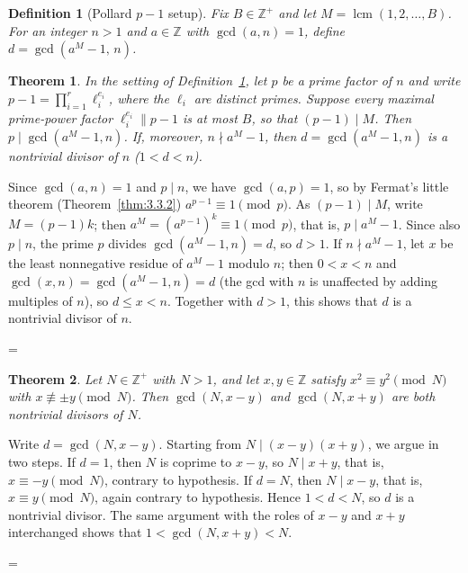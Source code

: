 \documentclass[11pt]{article}
\makeatletter
\theoremstyle{ntstyle}
\newtheorem{theorem}{Theorem}[subsection]
\newtheorem{definition}{Definition}[subsection]
\let\nt@closedisplay\]
\def\nt@guardedclose{\@ifnextchar\par{\nt@closeafterpar}{\@ifnextchar\end{\postdisplaypenalty\@M\nt@closedisplay}{\nt@closedisplay}}}
\def\nt@closeafterpar\par{\@ifnextchar\par{\nt@closeafterpar}{\@ifnextchar\end{\postdisplaypenalty\@M\nt@closedisplay\par}{\nt@closedisplay\par}}}
\renewenvironment{proof}[1][\proofname]{\par
  \pushQED{\qed}\normalfont\topsep\medskipamount\edef\nt@afterproof{\@endparpenalty=\the\@endparpenalty\relax}\@beginparpenalty\@M\@endparpenalty\@M\let\]\nt@guardedclose\trivlist\item[]\textit{#1\@addpunct{.}} \ignorespaces}{\ifvmode\addpenalty\@M\fi\popQED\nt@afterproof\endtrivlist\@endpefalse}
\DeclareMathOperator{\lcm}{lcm}
\makeatother
\begin{document}
\begin{definition}[Pollard $p-1$ setup]\label{def:9.5.1} Fix $B\in\mathbb{Z}^+$ and let
	$M=\lcm(1, 2, \ldots, B)$. For an integer $n>1$ and $a\in\mathbb{Z}$
	with $\gcd(a, n)=1$, define $d = \gcd(a^M-1, \, n)$.

\end{definition}
\begin{theorem}\label{thm:9.5.2} In the setting of
	Definition~\ref{def:9.5.1}, let $p$ be a prime factor of $n$ and write
	$p-1=\prod_{i=1}^{r}\ell_i^{e_i}$, where the $\ell_i$ are distinct
	primes. Suppose every maximal prime-power factor
	$\ell_i^{e_i}\parallel p-1$ is at most $B$, so that $(p-1)\mid M$.
	Then $p \mid \gcd(a^M-1, n)$. If, moreover, $n \nmid
		a^M-1$, then $d=\gcd(a^M-1, n)$ is a nontrivial divisor of $n$ ($1<d<n$).

\end{theorem}

\begin{proof} Since $\gcd(a, n)=1$ and $p\mid n$,
	we have $\gcd(a, p)=1$, so by Fermat's little theorem (Theorem~\ref{thm:3.3.2})
	$a^{p-1}\equiv1\pmod{p}$. As $(p-1)\mid M$, write $M=(p-1)k$; then
	$a^M=(a^{p-1})^k\equiv1\pmod{p}$, that is, $p\mid a^M-1$. Since also
	$p\mid n$, the prime $p$ divides $\gcd(a^M-1, n)=d$, so $d>1$. If $n\nmid
		a^M-1$, let $x$ be the least nonnegative residue of $a^M-1$ modulo
	$n$; then $0<x<n$ and $\gcd(x, n)=\gcd(a^M-1, n)=d$ (the gcd with $n$ is
	unaffected by adding multiples of $n$), so $d\le x<n$. Together with
	$d>1$, this shows that $d$ is a nontrivial divisor of $n$.

\end{proof}
\begin{theorem}\label{thm:9.5.3}
	Let $N\in\mathbb{Z}^+$ with $N>1$, and let $x,y\in\mathbb{Z}$ satisfy
	$x^{2}\equiv y^{2}\pmod{N}$ with $x\not\equiv\pm y\pmod{N}$.
	Then $\gcd(N,x-y)$ and $\gcd(N,x+y)$ are both nontrivial divisors of $N$.

\end{theorem}

\begin{proof} Write $d=\gcd(N,x-y)$. Starting from $N\mid(x-y)(x+y)$, we argue in
	two steps. If $d=1$, then $N$ is coprime to $x-y$, so $N\mid x+y$,
	that is, $x\equiv-y\pmod{N}$, contrary to hypothesis. If $d=N$, then
	$N\mid x-y$, that is, $x\equiv y\pmod{N}$, again contrary to hypothesis. Hence
	$1<d<N$, so $d$ is a nontrivial divisor. The same argument with the roles of
	$x-y$ and $x+y$ interchanged shows that $1<\gcd(N,x+y)<N$.

\end{proof}
\end{document}

